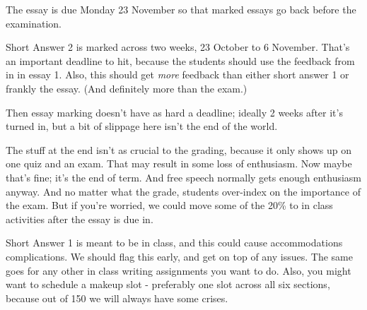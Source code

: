 \documentclass[
  letterpaper,
  DIV=11,
  numbers=noendperiod]{scrartcl}
\begin{document}
The essay is due Monday 23 November so that marked essays go back before
the examination.

Short Answer 2 is marked across two weeks, 23 October to 6 November.
That's an important deadline to hit, because the students should use the
feedback from in in essay 1. Also, this should get \emph{more} feedback
than either short answer 1 or frankly the essay. (And definitely more
than the exam.)

Then essay marking doesn't have as hard a deadline; ideally 2 weeks
after it's turned in, but a bit of slippage here isn't the end of the
world.

The stuff at the end isn't as crucial to the grading, because it only
shows up on one quiz and an exam. That may result in some loss of
enthusiasm. Now maybe that's fine; it's the end of term. And free speech
normally gets enough enthusiasm anyway. And no matter what the grade,
students over-index on the importance of the exam. But if you're
worried, we could move some of the 20\% to in class activities after the
essay is due in.

Short Answer 1 is meant to be in class, and this could cause
accommodations complications. We should flag this early, and get on top
of any issues. The same goes for any other in class writing assignments
you want to do. Also, you might want to schedule a makeup slot -
preferably one slot across all six sections, because out of 150 we will
always have some crises.
\end{document}
